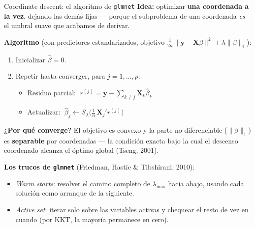 \documentclass{beamer}
\newcommand{\1}{\mathbb{I}}
\begin{document}
\begin{frame}{Coordinate descent: el algoritmo de \texttt{glmnet}}
\small
\textbf{Idea:} optimizar \textbf{una coordenada a la vez}, dejando las demás fijas --- porque el subproblema de una coordenada \emph{es} el umbral suave que acabamos de derivar.
\pause

\vspace{0.15cm}
\textbf{Algoritmo} (con predictores estandarizados, objetivo $\tfrac{1}{2n}\|\mathbf{y}-\mathbf{X}\beta\|^2 + \lambda\|\beta\|_1$):
\begin{enumerate}\itemsep3pt
  \item Inicializar $\hat{\beta} = 0$.
  \item Repetir hasta converger, para $j = 1, \ldots, p$:
  \begin{itemize}\itemsep2pt
    \item Residuo parcial: $\; r^{(j)} = \mathbf{y} - \sum_{k \neq j} \mathbf{X}_k \hat{\beta}_k$
    \item Actualizar: $\; \hat{\beta}_j \leftarrow S_{\lambda}\!\big( \tfrac{1}{n}\, \mathbf{X}_j' r^{(j)} \big)$
  \end{itemize}
\end{enumerate}
\pause

\textbf{¿Por qué converge?} El objetivo es convexo y la parte no diferenciable ($\|\beta\|_1$) es \textbf{separable} por coordenadas --- la condición exacta bajo la cual el descenso coordenado alcanza el óptimo global (Tseng, 2001).
\pause

\vspace{0.1cm}
\textbf{Los trucos de \texttt{glmnet}} (Friedman, Hastie \& Tibshirani, 2010):
\begin{itemize}\itemsep2pt
  \item \emph{Warm starts}: resolver el camino completo de $\lambda_{\max}$ hacia abajo, usando cada solución como arranque de la siguiente.
  \item \emph{Active set}: iterar solo sobre las variables activas y chequear el resto de vez en cuando (por KKT, la mayoría permanece en cero).
\end{itemize}
\end{frame}
\end{document}
